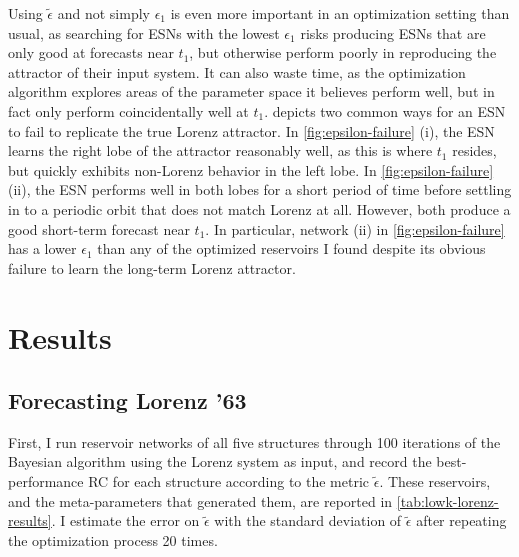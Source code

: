 Using $\tilde{\epsilon}$ and not simply $\epsilon_1$ is even more
important in an optimization setting than usual, as searching for ESNs
with the lowest $\epsilon_1$ risks producing ESNs that are only good
at forecasts near $t_1$, but otherwise perform poorly in reproducing
the attractor of their input system. It can also waste time, as the
optimization algorithm explores areas of the parameter space it
believes perform well, but in fact only perform coincidentally well at
$t_1$.  depicts two common ways for an ESN
to fail to replicate the true Lorenz attractor. In
\cref{fig:epsilon-failure} (i), the ESN learns the right lobe of the
attractor reasonably well, as this is where $t_1$ resides, but quickly
exhibits non-Lorenz behavior in the left lobe. In
\cref{fig:epsilon-failure} (ii), the ESN performs well in both lobes
for a short period of time before settling in to a periodic orbit that
does not match Lorenz at all. However, both produce a good short-term
forecast near $t_1$. In particular, network (ii) in
\cref{fig:epsilon-failure} has a lower $\epsilon_1$ than any of the
optimized reservoirs I found despite its obvious failure to learn the
long-term Lorenz attractor.

\section{Results}

\subsection{Forecasting Lorenz '63}

First, I run reservoir networks of all five structures through 100 iterations of
the Bayesian algorithm using the Lorenz system as input, and record
the best-performance RC for each structure according to the metric
$\tilde{\epsilon}$. These reservoirs, and the meta-parameters that
generated them, are reported in \cref{tab:lowk-lorenz-results}. I
estimate the error on $\tilde{\epsilon}$ with the standard deviation of
$\tilde{\epsilon}$ after repeating the optimization process 20 times.

